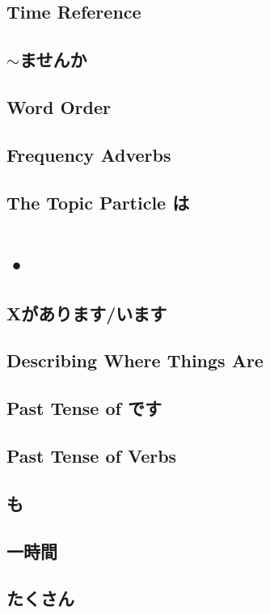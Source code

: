 \documentclass{article}
\begin{document}
   \subsection{Time Reference}
   
   
   
   \subsection{$\sim$ませんか}
   \subsection{Word Order}
   \subsection{Frequency Adverbs}
   \subsection{The Topic Particle は}
   
   \newpage
   
   \section{•}
   \subsection{Xがあります/います}
   \subsection{Describing Where Things Are}
   \subsection{Past Tense of です}
   \subsection{Past Tense of Verbs}
   \subsection{も}
   \subsection{一時間}
   \subsection{たくさん}
\end{document}
